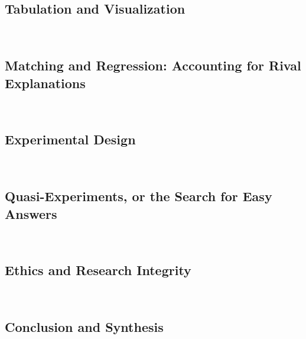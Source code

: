 \documentclass[12pt,a4paper]{article}
\newcommand{\lecture}[3][\DefaultOpt]{%
  \def\DefaultOpt{#2}%
  \clearpage\subsection[#1]{#2}\emph{#3}\vspace{.25em}\\
}
\begin{document}
\lecture{Tabulation and Visualization}{}

\lecture{Matching and Regression: Accounting for Rival Explanations}{}

\lecture{Experimental Design}{}

\lecture{Quasi-Experiments, or the Search for Easy Answers}{} %

\lecture{Ethics and Research Integrity}{}

\lecture{Conclusion and Synthesis}{}





\end{document}

